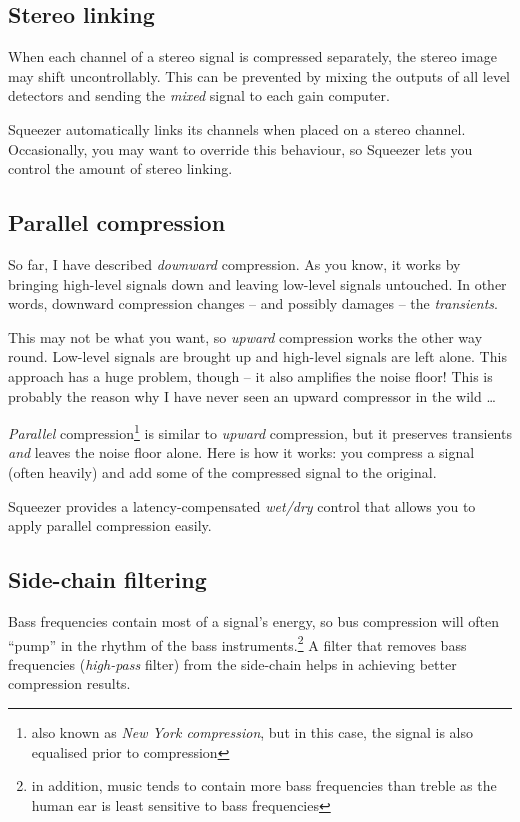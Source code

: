 \subsection{Stereo linking}
\label{sec:stereo_linking}

When each channel of a stereo signal is compressed separately, the
stereo image may shift uncontrollably.  This can be prevented by
mixing the outputs of all level detectors and sending the \emph{mixed}
signal to each gain computer.

Squeezer automatically links its channels when placed on a stereo
channel.  Occasionally, you may want to override this behaviour, so
Squeezer lets you control the amount of stereo linking.

\subsection{Parallel compression}
\label{sec:parallel_compression}

So far, I have described \emph{downward} compression.  As you know, it
works by bringing high-level signals down and leaving low-level
signals untouched.  In other words, downward compression changes --
and possibly damages -- the \emph{transients}.

This may not be what you want, so \emph{upward} compression works the
other way round.  Low-level signals are brought up and high-level
signals are left alone.  This approach has a huge problem, though --
it also amplifies the noise floor!  This is probably the reason why I
have never seen an upward compressor in the wild \dots

\emph{Parallel} compression\footnote{also known as \emph{New York
    compression}, but in this case, the signal is also equalised prior
  to compression} is similar to \emph{upward} compression, but it
preserves transients \emph{and} leaves the noise floor alone.  Here is
how it works: you compress a signal (often heavily) and add some of
the compressed signal to the original.

Squeezer provides a latency-compensated \emph{wet/dry} control that
allows you to apply parallel compression easily.

\subsection{Side-chain filtering}
\label{sec:side_chain_filtering}

Bass frequencies contain most of a signal's energy, so bus compression
will often ``pump'' in the rhythm of the bass instruments.\footnote{in
  addition, music tends to contain more bass frequencies than treble
  as the human ear is least sensitive to bass frequencies} A filter
that removes bass frequencies (\emph{high-pass} filter) from the
side-chain helps in achieving better compression results.

